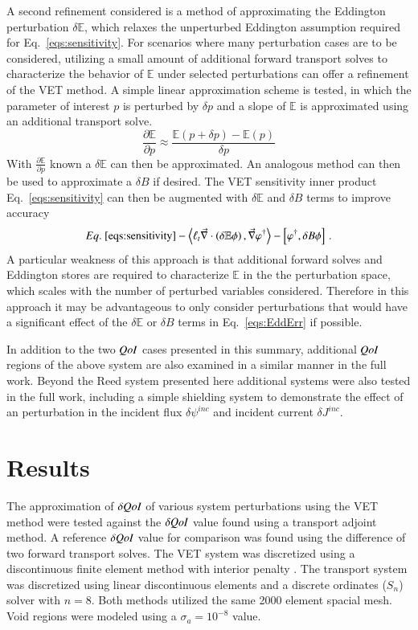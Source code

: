 \documentclass{anstrans}
\newcommand{\bra}{\left\langle}
\newcommand{\ket}{\right\rangle}
\newcommand{\sbra}{\left[}
\newcommand{\sket}{\right]}
\renewcommand{\div}{\vec{\nabla} \cdot}
\newcommand{\grad}{\vec{\nabla}}
\newcommand{\vefadj}{\varphi^\dag}
\newcommand{\Edd}{\mathbb{E}}
\newcommand{\BEdd}{B}
\newcommand{\siga}{\sigma_a}
\newcommand{\isigt}{\ell_t}
\newcommand{\qoi}{{\it QoI}\xspace}
\begin{document}
A second refinement considered is a method of approximating the Eddington perturbation $\delta \Edd$, which relaxes the unperturbed Eddington assumption required for Eq.~\eqref{eqs:sensitivity}. For scenarios where many perturbation cases are to be considered, utilizing a small amount of additional forward transport solves to characterize the behavior of $\Edd$ under selected perturbations can offer a refinement of the VET method. A simple linear approximation scheme is tested, in which the parameter of interest $p$ is perturbed by $\delta p$ and a slope of $\Edd$ is approximated using an additional transport solve. 
\begin{equation}
\label{Eddapprox}
\frac{\partial \Edd}{\partial p} \approx \frac{\Edd(p+\delta p) - \Edd(p)}{\delta p}
\end{equation}
With $\frac{\partial \Edd}{\partial p}$ known a $\delta \Edd$ can then be approximated. An analogous method can then be used to approximate a $\delta \BEdd$ if desired. The VET sensitivity inner product Eq.~\eqref{eqs:sensitivity} can then be augmented with $\delta \Edd$ and $\delta \BEdd$ terms to improve accuracy
\begin{equation}
\label{eqs:EddErr}
 Eq.~\eqref{eqs:sensitivity}- \bra  \isigt \div \left( \delta \Edd \phi \right), \grad \vefadj \ket
- \sbra \vefadj, \delta \BEdd \phi \sket \,.
\end{equation} 
A particular weakness of this approach is that additional forward solves and Eddington stores are required to characterize $\Edd$ in the the perturbation space, which scales with the number of perturbed variables considered. Therefore in this approach it may be advantageous to only consider perturbations that would have a significant effect of the $\delta \Edd$ or $\delta \BEdd$ terms in Eq.~\eqref{eqs:EddErr} if possible. 

In addition to the two $\qoi$ cases presented in this summary, additional $\qoi$ regions of the above system are also examined in a similar manner in the full work. Beyond the Reed system presented here additional systems were also tested in the full work, including a simple shielding system to demonstrate the effect of an perturbation in the incident flux $\delta \psi^{inc}$ and incident current $\delta J^{inc}$.



\section{Results}
The approximation of $\delta \qoi$ of various system perturbations using the VET method were tested against the $\delta \qoi$ value found using a transport adjoint method. A reference $\delta \qoi$ value for comparison was found using the difference of two forward transport solves. The VET system was discretized using a discontinuous finite element method with interior penalty \cite{Arnold}. The transport system was discretized using linear discontinuous elements and a discrete ordinates ($S_n$) solver with $n=8$. Both methods utilized the same 2000 element spacial mesh. Void regions were modeled using a $\siga=10^{-8}$ value.
\end{document}
